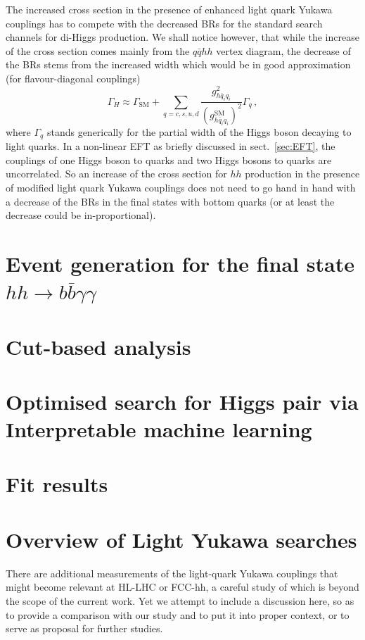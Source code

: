 The increased cross section in the presence of enhanced light quark Yukawa couplings has to compete with the decreased BRs for the standard search channels for di-Higgs production.
We shall notice however, that while the increase of the cross section comes mainly from the $q\bar{q}hh$ vertex diagram, the decrease of the BRs stems from the increased width which would be in good approximation (for flavour-diagonal couplings)
\begin{equation}
	\Gamma_H \approx \Gamma_{\text{SM}}+\sum_{q=c,s,u,d}\frac{g_{h \bar{q}_i q_i}^2}{(g_{h \bar{q}_i q_i}^{\text{SM}})^2}\Gamma_{q}\,,
\end{equation}
where $\Gamma_q$ stands generically for the partial width of the Higgs boson decaying to light quarks.
In a non-linear EFT as briefly discussed in sect.~\ref{sec:EFT}, the couplings of one Higgs boson to quarks and two Higgs bosons to quarks are uncorrelated.
So an increase of the cross section for $hh$ production in the presence of modified light quark Yukawa couplings does not need to go hand in hand with a decrease of the BRs in the final states with bottom quarks (or at least the decrease could be in-proportional).

\section{Event generation for the final state $ hh \to b \bar b \gamma \gamma$ \label{sec:evnt}}
\section{Cut-based analysis \label{sec:cutbasedly}}
\section{Optimised search for Higgs pair via Interpretable machine learning \label{sec:mlanalysisly}}
\section{Fit results\label{sec:resultsly}}
\section{Overview of Light Yukawa searches \label{sec:comparetoothers}}
There are additional measurements of the light-quark Yukawa couplings that might become relevant at HL-LHC or FCC-hh, a careful study of which is beyond the scope of the current work. Yet we attempt to include a discussion here, so as to provide a comparison with our study and to put it into proper context, or to serve as proposal for further studies.


